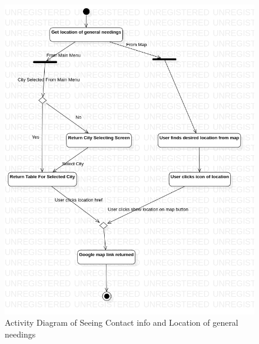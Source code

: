 \begin{center}
    \begin{figure}[H]
        \begin{center}
            \includegraphics[scale=0.5]{assets/ActivityDiagram.png}
            \caption[Activity Diagram of Seeing Contact info and Location of general needings]{Activity Diagram of Seeing Contact info and Location of general needings}
        \end{center}
    \end{figure}

    ~\\~\\~\\


\end{center}
